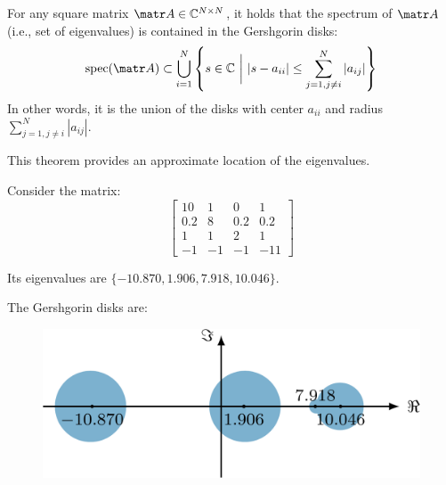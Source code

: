 \begin{subappendices}
\begin{theorem}[Gershgorin] \label{th:gershgorin} 
    For any square matrix $\A \in \mathbb{C}^{N \times N}$, it holds that the spectrum of $\A$ (i.e., set of eigenvalues) is contained in the Gershgorin disks:
    \[
        \text{spec}(\A) \subset \bigcup_{i=1}^{N} \left\{ s \in \mathbb{C} \,\,\bigg|\,\, |s - a_{ii}| \leq \sum_{j=1, j \neq i}^{N} |a_{ij}| \right\}
    \]
    In other words, it is the union of the disks with center $a_{ii}$ and radius $\sum_{j=1, j \neq i}^{N} |a_{ij}|$.

    \indenttbox
    \begin{remark}
        This theorem provides an approximate location of the eigenvalues.
    \end{remark}

    \indenttbox
    \begin{example}
        Consider the matrix:
        \[
            \begin{bmatrix}
                10 & 1 & 0 & 1 \\
                0.2 & 8 & 0.2 & 0.2 \\
                1 & 1 & 2 & 1 \\
                -1 & -1 & -1 & -11
            \end{bmatrix}
        \]

        Its eigenvalues are $\{ -10.870, 1.906, 7.918, 10.046 \}$.

        The Gershgorin disks are:
        \begin{figure}[H]
            \centering
            \includegraphics[width=0.4\linewidth]{./img/gershgorin.png}
        \end{figure}
    \end{example}
\end{theorem}




\end{subappendices}

